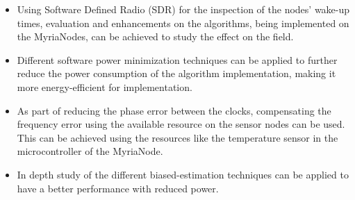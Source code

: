 \documentclass[journal]{IEEEtran}
\begin{document}
\begin{itemize}
 \item
Using Software Defined Radio (SDR) for the inspection of the nodes' wake-up times, evaluation and enhancements on the algorithms, being
implemented on the MyriaNodes, can be achieved to study the effect on the field.
\item
Different software power minimization techniques can be applied to further reduce the
power consumption of the algorithm implementation, making it more
energy-efficient for implementation.
\item As part of reducing the phase error between the clocks, compensating the frequency error using the available resource on the sensor nodes can be used. This can be achieved using the resources like the temperature sensor in the
microcontroller of the MyriaNode.
\item In depth study of the different biased-estimation techniques can be applied to have a better performance with reduced power.
\end{itemize}
\end{document}
